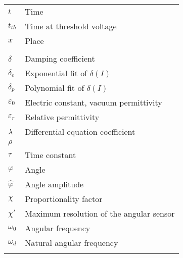 \begin{longtable}[l]{@{}ll@{}}
	\( t \) & Time\\
	\( t_{th} \) & Time at threshold voltage\\
	\( x \) & Place\\
	\\
	\( \delta \) & Damping coefficient\\
	\( \delta_e \) & Exponential fit of \( \delta(I) \)\\
	\( \delta_p \) & Polynomial fit of \( \delta(I) \)\\
	\( \varepsilon_0 \) & Electric constant, vacuum permittivity\\
	\( \varepsilon_r \) & Relative permittivity\\
	\( \lambda \) & Differential equation coefficient\\
	\( \rho \) & \\
	\(\tau\) & Time constant\\
	\( \varphi \) & Angle\\
	\( \hat{\varphi} \) & Angle amplitude\\
    \( \chi \) & Proportionality factor\\
    \( \chi' \) & Maximum resolution of the angular sensor\\
    \( \omega_0 \) & Angular frequency\\
    \( \omega_d \) & Natural angular frequency\\
    \(  \) & \\
\end{longtable}
\label{tab:glossar}